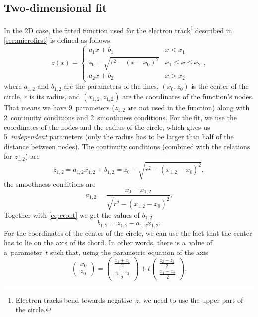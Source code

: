 		\subsection{Two-dimensional fit}
			In the 2D case, the fitted function used for the electron track\footnote{Electron tracks bend towards negative~$z$, we need to use the upper part of the circle.} described in \cref{sec:microfirst} is defined as follows:
				\begin{equation}
					\label{eq:clines2d}
					z(x) = \begin{cases}
								a_1x+b_1 & x<x_1\\
								z_0+\sqrt{r^2-(x-x_0)^2} & x_1\leq x\leq x_2\\
								a_2x+b_2 & x>x_2
						   \end{cases},
				\end{equation}
			where $a_{1,2}$ and $b_{1,2}$ are the parameters of the lines, $(x_0,z_0)$ is the center of the circle, $r$ is its radius, and $(x_{1,2},z_{1,2})$ are the coordinates of the function's nodes. That means we have 9~parameters ($z_{1,2}$ are not used in the function) along with 2~continuity conditions and 2~smoothness conditions. For the fit, we use the coordinates of the nodes and the radius of the circle, which gives us 5~\emph{independent} parameters (only the radius has to be larger than half of the distance between nodes). The continuity conditions (combined with the relations for $z_{1,2}$) are
				\begin{equation}
					\label{eq:ccont}
					z_{1,2} = a_{1,2}x_{1,2}+b_{1,2} = z_0-\sqrt{r^2-(x_{1,2}-x_0)^2},
				\end{equation}
			the smoothness conditions are
				\begin{equation}
					\label{eq:a12}
					a_{1,2} = \frac{x_0-x_{1,2}}{\sqrt{r^2-(x_{1,2}-x_0)^2}}.
				\end{equation}
			Together with \cref{eq:ccont} we get the values of $b_{1,2}$
				\begin{equation}
					\label{eq:b12}
					b_{1,2} = z_{1,2} - a_{1,2} x_{1,2}.
				\end{equation}
			For the coordinates of the center of the circle, we can use the fact that the center has to lie on the axis of its chord. In other words, there is a~value of a~parameter~$t$ such that, using the parametric equation of the axis
				\begin{equation}
					\begin{pmatrix} x_0\\ z_0 \end{pmatrix} = \begin{pmatrix} \frac{x_1+x_2}{2}\\ \frac{z_1+z_2}{2} \end{pmatrix} + t \begin{pmatrix} \frac{z_2-z_1}{2}\\ \frac{x_1-x_2}{2} \end{pmatrix}.
				\end{equation}
